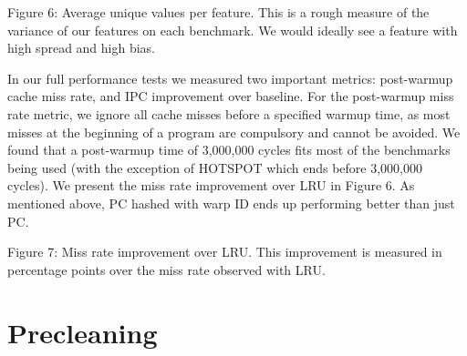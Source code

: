 Figure 6: Average unique values per feature. This is a rough measure of the variance of our features on each benchmark. We would ideally see a feature with high spread and high bias.

In our full performance tests we measured two important metrics: post-warmup cache miss rate, and IPC improvement over baseline. For the post-warmup miss rate metric, we ignore all cache misses before a specified warmup time, as most misses at the beginning of a program are compulsory and cannot be avoided. We found that a post-warmup time of 3,000,000 cycles fits most of the benchmarks being used (with the exception of HOTSPOT which ends before 3,000,000 cycles). We present the miss rate improvement over LRU in Figure 6. As mentioned above, PC hashed with warp ID ends up performing better than just PC.


Figure 7: Miss rate improvement over LRU. This improvement is measured in percentage points over the miss rate observed with LRU.

\section{Precleaning}
